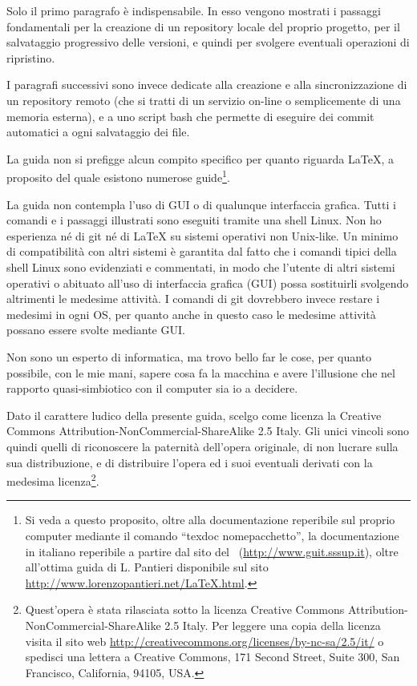 \documentclass[a4paper,12pt,oneside]{article}
\begin{document}
Solo il primo paragrafo è indispensabile. In esso vengono mostrati i passaggi
fondamentali per la creazione di un repository locale del proprio progetto, per
il salvataggio progressivo delle versioni, e quindi per svolgere eventuali
operazioni di ripristino.

I paragrafi successivi sono invece dedicate alla creazione e alla
sincronizzazione di un repository remoto (che si tratti di un servizio on-line
o semplicemente di una memoria esterna), e a uno script bash che permette di
eseguire dei commit automatici a ogni salvataggio dei file.

La guida non si prefigge alcun compito specifico per quanto riguarda \LaTeX, a
proposito del quale esistono numerose guide\footnote{Si veda a questo proposito,
oltre alla documentazione reperibile sul proprio computer mediante il comando
``texdoc nomepacchetto'', la documentazione in italiano reperibile a partire dal
sito del \guit\ (\url{http://www.guit.sssup.it}), oltre all'ottima guida di L. Pantieri
disponibile sul sito \url{http://www.lorenzopantieri.net/LaTeX.html}.}.

La guida non contempla l'uso di GUI o di qualunque interfaccia grafica. Tutti i
comandi e i passaggi illustrati sono eseguiti tramite una shell Linux.
Non ho esperienza né di git né di \LaTeX{} su sistemi operativi non
Unix-like. Un minimo di compatibilità con altri sistemi è garantita dal fatto
che i comandi tipici della shell Linux sono evidenziati e commentati, in modo
che l'utente di altri sistemi operativi o abituato all'uso di interfaccia grafica
(GUI) possa sostituirli svolgendo altrimenti le medesime attività. I comandi di
git dovrebbero invece restare i medesimi in ogni OS, per quanto anche in questo
caso le medesime attività possano essere svolte mediante GUI.

Non sono un esperto di informatica, ma trovo bello far le cose, per quanto
possibile, con le mie mani, sapere cosa fa la macchina e avere l'illusione che
nel rapporto quasi-simbiotico con il computer sia io a decidere.

Dato il carattere ludico della presente guida, scelgo come licenza la Creative
Commons Attribution-NonCommercial-ShareAlike 2.5 Italy. Gli unici vincoli sono
quindi quelli di riconoscere la paternità dell'opera
originale, di non lucrare sulla sua distribuzione, e di distribuire l'opera ed
i suoi eventuali derivati con la medesima licenza\footnote{
Quest'opera è stata rilasciata sotto la licenza
Creative Commons Attribution-NonCommercial-ShareAlike 2.5 Italy.
Per leggere una copia della licenza visita il sito web
\url{http://creativecommons.org/licenses/by-nc-sa/2.5/it/}
o spedisci una lettera a Creative Commons, 171 Second Street, Suite 300, San
Francisco, California, 94105, USA.}.
\end{document}
